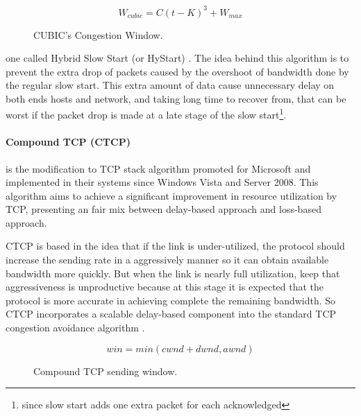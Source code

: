 \begin{figure}[ht]
\begin{minipage}{6cm}
\centering
\[ W_{cubic} = C(t - K)^3 + W_{max} \]
    \caption{CUBIC's Congestion Window.\protect\footnotemark}
    \label{fig:cubicform}
\end{minipage}%
\end{figure}%


\noindent  one called Hybrid Slow Start (or HyStart) \cite{HaElephants}. 
The idea behind this algorithm is to prevent the extra drop of packets caused by the
overshoot of bandwidth done by the regular slow start. This extra amount of data 
cause unnecessary delay on both ends hosts and network, and taking long time to
recover from, that can be worst if the packet drop is made at a late stage of
the slow start\footnote{since slow start adds one extra packet for each
acknowledged}.

\paragraph{Compound TCP (CTCP)} is the modification to TCP stack algorithm promoted
for Microsoft and implemented in their systems since Windows Vista and Server
2008. This algorithm aims to achieve a significant improvement in resource
utilization by TCP, presenting an fair mix between delay-based approach and
loss-based approach.

CTCP is based in the idea that if the link is under-utilized, the protocol
should increase the sending rate in a aggressively manner so it can obtain
available bandwidth more quickly. But when the link is nearly full
utilization, keep that aggressiveness is unproductive because at this stage it
is expected that the protocol is more accurate in achieving complete the
remaining bandwidth. So CTCP incorporates a scalable delay-based component
into the standard TCP congestion avoidance algorithm \cite{4146841}.

\begin{figure}
  \begin{center}
    \[ win = min(cwnd + dwnd, awnd)\]
  \end{center}
  \caption{Compound TCP sending window.\protect\footnotemark}
  \label{fig:ctcpform}
\end{figure}

